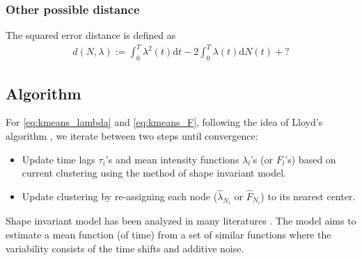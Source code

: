 
	 	\subsubsection*{Other possible distance}
			The squared error distance is defined as 
			\begin{align*}
			d(N,\lambda) := \int_0^T\lambda^2(t)\text{d} t - 2\int_0^T \lambda(t)\text{d}N(t)+?
			\end{align*}





	\subsection{Algorithm}
		For \eqref{eq:kmeans_lambda} and \eqref{eq:kmeans_F}, following the idea of Lloyd's algorithm \cite{Lloyd1982},
		we iterate between two steps until convergence:
		\begin{itemize}
		\item Update time lags $\tau_i$'s and mean intensity functions $\lambda_l$'s (or $F_l$'s) based on  current clustering using the method of shape invariant model.
		\item Update clustering by re-assigning each node ($\hat\lambda_{N_i}$ or $\hat F_{N_i}$) to its nearest center.
		\end{itemize}


			Shape invariant model has been analyzed in many literatures \cite{Bontemps2014,Bigot2013,Ronn2009,Gervini2005,Vimond2010,Gamboa2007,JeremieBigot2010,Wang1997}. 
			The model aims to estimate a mean function (of time) from a set of similar functions where the variability consists of the time shifts and additive noise.

